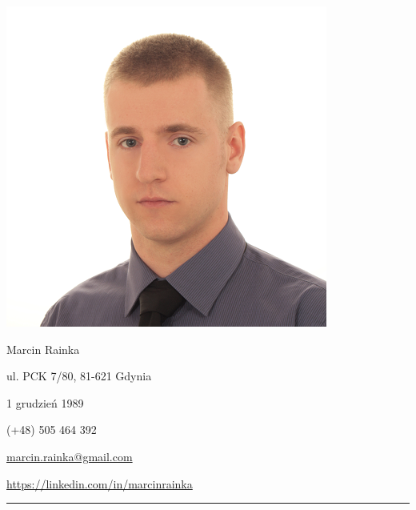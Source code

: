 \documentclass[11pt,a4paper]{article}
\begin{document}
    \pagestyle{empty}
  
    \begin{center}
        \begin{minipage}[b]{3cm}
            \includegraphics[scale=0.28, right]{photo.png}
        \end{minipage}
        \hspace{0.2cm}
        \begin{minipage}[b]{7cm}
            {\Large \sc Marcin Rainka}
            \begin{description} \itemsep1pt \parskip0pt 
                \item[Adres] ul. PCK 7/80, 81-621 Gdynia
                \item[Data urodzenia] 1 grudzień 1989
                \item[Telefon] (+48) 505 464 392
                \item[E-mail] \href{mailto:marcin.rainka@gmail.com}{marcin.rainka@gmail.com}
                \item[LinkedIn] \href{https://linkedin.com/in/marcinrainka}{https://linkedin.com/in/marcinrainka}
            \end{description}
        \end{minipage}
    \end{center}

    \vspace{-0.4cm}

    \noindent\rule{\textwidth}{0.1mm}
  
  
\end{document}

